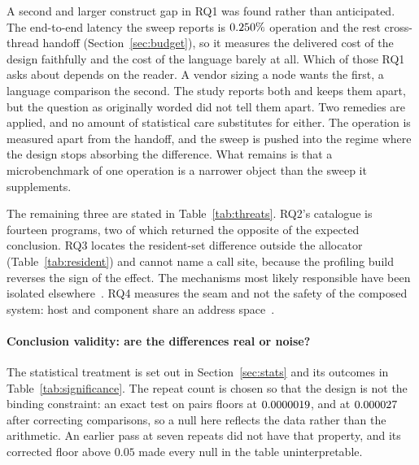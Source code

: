 \documentclass[english,oneside,a4paper,censored,csm,software-track-2020]{HYthesisML}
\begin{document}
A second and larger construct gap in RQ1 was found rather than anticipated. The end-to-end latency
the sweep reports is $0.250\%$ operation and the rest cross-thread handoff
(Section~\ref{sec:budget}), so it measures the delivered cost of the design faithfully and the
cost of the language barely at all. Which of those RQ1 asks about depends on the reader. A vendor
sizing a node wants the first, a language comparison the second. The study reports both and keeps
them apart, but the question as originally worded did not tell them apart. Two remedies are
applied, and no amount of statistical care substitutes for either. The operation is measured apart
from the handoff, and the sweep is pushed into the regime where the design stops absorbing the
difference. What remains is that a microbenchmark of one operation is a narrower object than the
sweep it supplements.

The remaining three are stated in Table~\ref{tab:threats}. RQ2's catalogue is fourteen
programs, two of which returned the opposite of the expected conclusion. RQ3 locates the
resident-set difference outside the allocator (Table~\ref{tab:resident}) and cannot name a call
site, because the profiling build reverses the sign of the effect. The mechanisms most likely
responsible have been isolated elsewhere~\cite{zhang2022runtime,harris2023morello}. RQ4
measures the seam and not the safety of the composed system: host and component share an address
space~\cite{rivera2021galeed,kirth2022pkrusafe}.

\paragraph{Conclusion validity: are the differences real or noise?}
The statistical treatment is set out in Section~\ref{sec:stats} and its outcomes in
Table~\ref{tab:significance}. The repeat count is chosen so that the design is not the binding
constraint: an exact test on \NRepeats{} pairs floors at $0.0000019$, and at
$0.000027$ after correcting \NTests{} comparisons, so a null here reflects the data rather
than the arithmetic. An earlier pass at seven repeats did not have that property, and its
corrected floor above $0.05$ made every null in the table uninterpretable.
\end{document}
